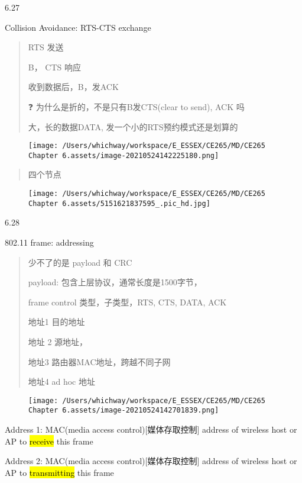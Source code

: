\documentclass[
]{article}
\begin{document}
6.27

Collision Avoidance: RTS-CTS exchange

\begin{quote}
RTS 发送

B， CTS 响应

收到数据后，B，发ACK

❓ 为什么是折的，不是只有B发CTS(clear to send), ACK 吗

大，长的数据DATA, 发一个小的RTS预约模式还是划算的
\end{quote}

\begin{figure}
\centering
\texttt{[image: /Users/whichway/workspace/E\_ESSEX/CE265/MD/CE265 Chapter 6.assets/image-20210524142225180.png]}
\caption{}
\end{figure}

\begin{quote}
四个节点
\end{quote}

\begin{figure}
\centering
\texttt{[image: /Users/whichway/workspace/E\_ESSEX/CE265/MD/CE265 Chapter 6.assets/5151621837595\_.pic\_hd.jpg]}
\caption{}
\end{figure}

6.28

802.11 frame: addressing

\begin{quote}
少不了的是 payload 和 CRC

payload: 包含上层协议，通常长度是1500字节，

frame control 类型，子类型，RTS, CTS, DATA, ACK

地址1 目的地址

地址 2 源地址，

地址3 路由器MAC地址，跨越不同子网

地址4 ad hoc 地址
\end{quote}

\begin{figure}
\centering
\texttt{[image: /Users/whichway/workspace/E\_ESSEX/CE265/MD/CE265 Chapter 6.assets/image-20210524142701839.png]}
\caption{}
\end{figure}

Address 1: MAC(media access control){[}媒体存取控制{]} address of
wireless host or AP to \hl{receive} this frame

\begin{quote}
\end{quote}

Address 2: MAC(media access control){[}媒体存取控制{]} address of
wireless host or AP to \hl{transmitting} this frame
\end{document}
